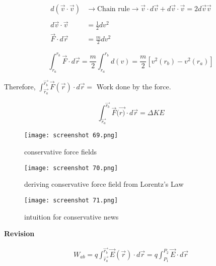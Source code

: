 \documentclass[svgnames]{article}   	%
\begin{document}
\begin{align*}
  d(\vec{v} \cdot \vec{v}) &\rightarrow \text{Chain rule} \rightarrow \vec{v}
  \cdot d\vec{v} + d\vec{v} \cdot \vec{v} = 2 d\vec{v} \vec{v} \\\\
  d\vec{v} \cdot \vec{v} &= \frac{1}{2}dv^2 \\
  \vec{F}\cdot d\vec{r} &= \frac{m}{2} dv^2 
\end{align*}

\vspace{5px} \[
  \int_{r_a}^{r_b} \vec{F}\cdot d\vec{r} = \frac{m}{2}\int_{r_a}^{r_b} d(v)
  = \frac{m}{2}\left[v^2(r_b) - v^2(r_a) \right]
\] \vspace{5px}

Therefore, $\int_{\vec{r_a}}^{\vec{r_b}} \vec{F}(\vec{r}) \cdot d\vec{r}
= $ Work done by the force. 
\vspace{5px}
\begin{tcolorbox}
\[
  \int_{\vec{r_a}}^{\vec{r_b}} \vec{F}(\vec{r)} \cdot d\vec{r} = \Delta KE 
\]
\end{tcolorbox}

\begin{figure}[H]
  \centering
    \texttt{[image: screenshot 69.png]}
    \caption{conservative force fields}
\end{figure}




\begin{figure}[H]
  \centering
    \texttt{[image: screenshot 70.png]}
    \caption{deriving conservative force field from Lorentz's Law}
\end{figure}




\begin{figure}[H]
  \centering
    \texttt{[image: screenshot 71.png]}
    \caption{intuition for conservative news}
\end{figure}

\textbf{Revision}

\begin{align*}
  W_{ab} = q\int_{\vec{r_a}}^{\vec{r_b}} \vec{E}(\vec{r}) \cdot d\vec{r}
  = q\int_{P_1}^{P_2} \vec{E} \cdot d\vec{r}  
\end{align*}
\end{document}
